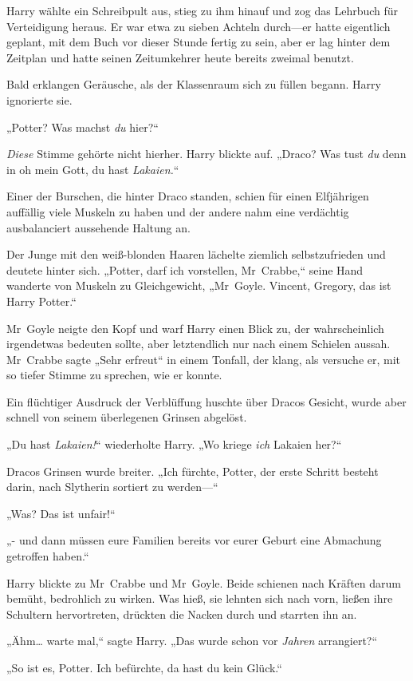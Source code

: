 {Harry wählte ein Schreibpult aus, stieg zu ihm hinauf und zog das Lehrbuch für Verteidigung heraus. Er war etwa zu sieben Achteln durch—er hatte eigentlich geplant, mit dem Buch vor dieser Stunde fertig zu sein, aber er lag hinter dem Zeitplan und hatte seinen Zeitumkehrer heute bereits zweimal benutzt.

Bald erklangen Geräusche, als der Klassenraum sich zu füllen begann. Harry ignorierte sie.

„Potter? Was machst \emph{du} hier?“

\emph{Diese} Stimme gehörte nicht hierher. Harry blickte auf. „Draco? Was tust \emph{du} denn in oh mein Gott, du hast \emph{Lakaien.}“

Einer der Burschen, die hinter Draco standen, schien für einen Elfjährigen auffällig viele Muskeln zu haben und der andere nahm eine verdächtig ausbalanciert aussehende Haltung an.

Der Junge mit den weiß-blonden Haaren lächelte ziemlich selbstzufrieden und deutete hinter sich. „Potter, darf ich vorstellen, Mr~Crabbe,“ seine Hand wanderte von Muskeln zu Gleichgewicht, „Mr~Goyle. Vincent, Gregory, das ist Harry Potter.“

Mr~Goyle neigte den Kopf und warf Harry einen Blick zu, der wahrscheinlich irgendetwas bedeuten sollte, aber letztendlich nur nach einem Schielen aussah. Mr~Crabbe sagte „Sehr erfreut“ in einem Tonfall, der klang, als versuche er, mit so tiefer Stimme zu sprechen, wie er konnte.

Ein flüchtiger Ausdruck der Verblüffung huschte über Dracos Gesicht, wurde aber schnell von seinem überlegenen Grinsen abgelöst.

„Du hast \emph{Lakaien!}“ wiederholte Harry. „Wo kriege \emph{ich} Lakaien her?“

Dracos Grinsen wurde breiter. „Ich fürchte, Potter, der erste Schritt besteht darin, nach Slytherin sortiert zu werden—“

„Was? Das ist unfair!“

„- und dann müssen eure Familien bereits vor eurer Geburt eine Abmachung getroffen haben.“

Harry blickte zu Mr~Crabbe und Mr~Goyle. Beide schienen nach Kräften darum bemüht, bedrohlich zu wirken. Was hieß, sie lehnten sich nach vorn, ließen ihre Schultern hervortreten, drückten die Nacken durch und starrten ihn an.

„Ähm… warte mal,“ sagte Harry. „Das wurde schon vor \emph{Jahren} arrangiert?“

„So ist es, Potter. Ich befürchte, da hast du kein Glück.“

}
